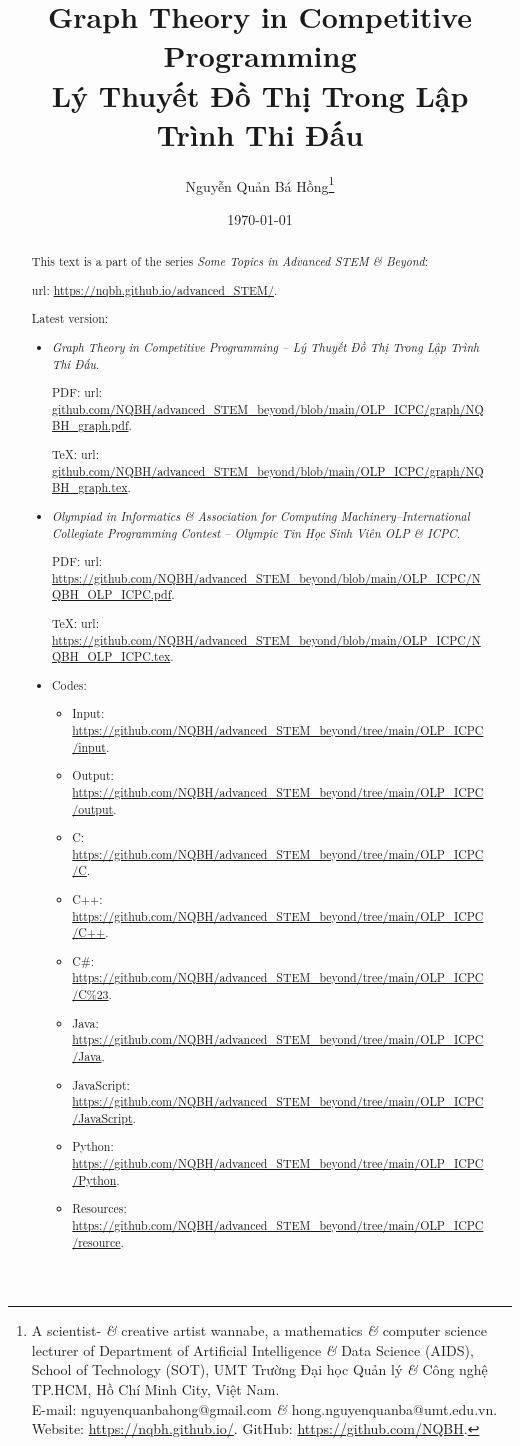 \documentclass{article}
\title{Graph Theory in Competitive Programming\\Lý Thuyết Đồ Thị Trong Lập Trình Thi Đấu}
\author{Nguyễn Quản Bá Hồng\footnote{A scientist- {\it\&} creative artist wannabe, a mathematics {\it\&} computer science lecturer of Department of Artificial Intelligence {\it\&} Data Science (AIDS), School of Technology (SOT), UMT Trường Đại học Quản lý {\it\&} Công nghệ TP.HCM, Hồ Chí Minh City, Việt Nam.\\E-mail: {\sf nguyenquanbahong@gmail.com} {\it\&} {\sf hong.nguyenquanba@umt.edu.vn}. Website: \url{https://nqbh.github.io/}. GitHub: \url{https://github.com/NQBH}.}}
\date{\today}
\begin{document}
\maketitle
\begin{abstract}
    This text is a part of the series {\it Some Topics in Advanced STEM \& Beyond}:

    {\sc url}: \url{https://nqbh.github.io/advanced_STEM/}.

    Latest version:
    \begin{itemize}
        \item {\it Graph Theory in Competitive Programming -- Lý Thuyết Đồ Thị Trong Lập Trình Thi Đấu}.

        PDF: {\sc url}: \url{github.com/NQBH/advanced_STEM_beyond/blob/main/OLP_ICPC/graph/NQBH_graph.pdf}.

        \TeX: {\sc url}: \url{github.com/NQBH/advanced_STEM_beyond/blob/main/OLP_ICPC/graph/NQBH_graph.tex}.
        \item {\it Olympiad in Informatics \& Association for Computing Machinery--International Collegiate Programming Contest -- Olympic Tin Học Sinh Viên OLP \& ICPC}.

        PDF: {\sc url}: \url{https://github.com/NQBH/advanced_STEM_beyond/blob/main/OLP_ICPC/NQBH_OLP_ICPC.pdf}.

        \TeX: {\sc url}: \url{https://github.com/NQBH/advanced_STEM_beyond/blob/main/OLP_ICPC/NQBH_OLP_ICPC.tex}.
        \item Codes:
        \begin{itemize}
            \item Input: \url{https://github.com/NQBH/advanced_STEM_beyond/tree/main/OLP_ICPC/input}.
            \item Output: \url{https://github.com/NQBH/advanced_STEM_beyond/tree/main/OLP_ICPC/output}.
            \item C: \url{https://github.com/NQBH/advanced_STEM_beyond/tree/main/OLP_ICPC/C}.
            \item C++: \url{https://github.com/NQBH/advanced_STEM_beyond/tree/main/OLP_ICPC/C++}.
            \item C\#: \url{https://github.com/NQBH/advanced_STEM_beyond/tree/main/OLP_ICPC/C%23}.
            \item Java: \url{https://github.com/NQBH/advanced_STEM_beyond/tree/main/OLP_ICPC/Java}.
            \item JavaScript: \url{https://github.com/NQBH/advanced_STEM_beyond/tree/main/OLP_ICPC/JavaScript}.
            \item Python: \url{https://github.com/NQBH/advanced_STEM_beyond/tree/main/OLP_ICPC/Python}.
            \item Resources: \url{https://github.com/NQBH/advanced_STEM_beyond/tree/main/OLP_ICPC/resource}.
        \end{itemize}
    \end{itemize}
\end{abstract}
\tableofcontents
\end{document}
